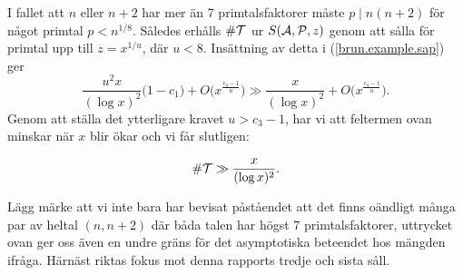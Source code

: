 I fallet att $n$ eller $n+2$ har mer än 7 primtalsfaktorer måste $p\mid n(n+2)$ för något primtal $p < n^{1/8}$.
Således erhålls $\card\mathcal{T}$ ur $\S{A}{P}{z}$ genom att sålla för primtal upp till $z = x^{1/u}$, där $u<8$.
Insättning av detta i (\ref{brun.example.sap}) ger
\begin{equation*}
    \frac{u^2x}{(\log x)^2}\bigl(1 - c_1\bigr) + O\bigl(x^{\frac{c_3 - 1}{u}}\bigr) \gg 
    \frac{x}{(\log x)^2} + O\bigl(x^{\frac{c_3 - 1}{u}}\bigr).
\end{equation*}
Genom att ställa det ytterligare kravet $u>c_3-1$, 
har vi att feltermen ovan minskar när $x$ blir ökar och vi får slutligen:
\begin{theorem}
\begin{equation*} \label{brun.example.bound}
    \card\mathcal{T} \gg \frac{x}{(\log x)^2}.
\end{equation*}
\end{theorem}
Lägg märke att vi inte bara har bevisat påståendet att det finns oändligt många par av heltal $(n,n+2)$ där båda talen har högst 7 primtalsfaktorer,
uttrycket ovan ger oss även en undre gräns för det asymptotiska beteendet hos mängden ifråga.
Härnäst riktas fokus mot denna rapports tredje och sista såll.